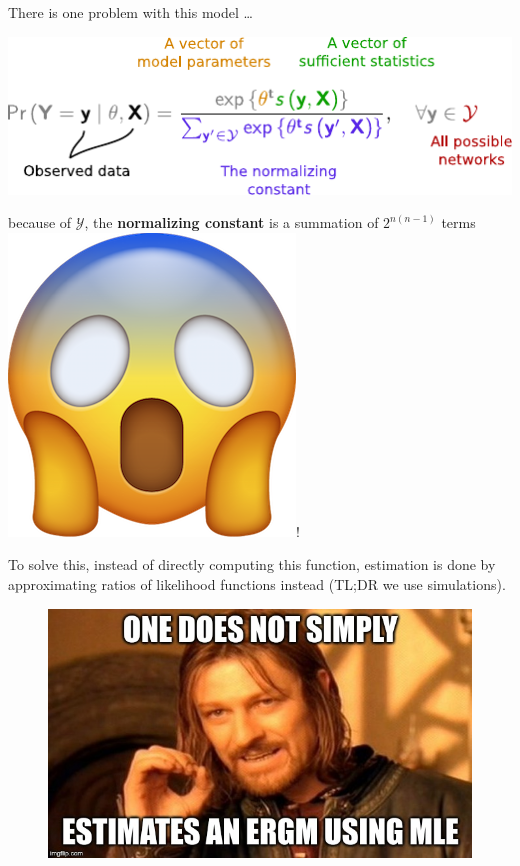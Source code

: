 \documentclass[10pt,ignorenonframetext,aspectratio=169,]{beamer}
\newcommand{\GRAPH}{\mathcal{Y}}
\begin{document}
\begin{frame}

\centering

There is one problem with this model \ldots{} \linebreak[4]

\includegraphics[width = .5\linewidth]{fig/parts-of-ergm.pdf}\pause \linebreak[4]

\large because of \color[HTML]{af0000}\(\GRAPH\)\color{black}, the
\color[HTML]{5726e7} \textbf{normalizing constant}\color{black}{} is
\linebreak[4] a summation of \(2^{n(n-1)}\) terms
\includegraphics[width=.05\linewidth]{fig/scared.png}!\normalsize

\end{frame}

\begin{frame}

To solve this, instead of directly computing this function, estimation
is done by approximating ratios of likelihood functions instead (TL;DR
we use simulations).

\begin{figure}
\includegraphics[width=.6\linewidth]{fig/simply-not.jpg}
\end{figure}

\end{frame}
\end{document}
